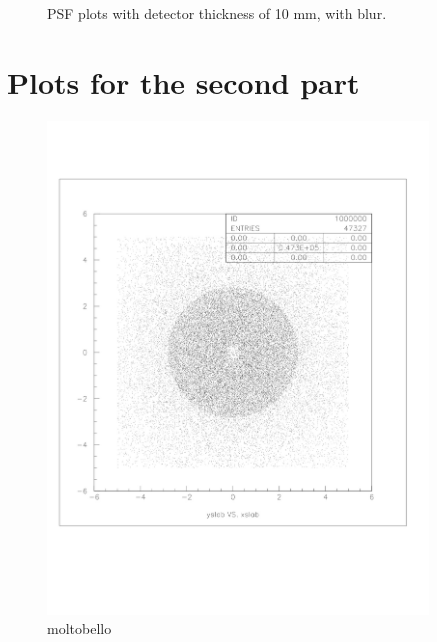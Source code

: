 \documentclass[a4paper]{article}
\begin{document}
\begin{figure}[H]
  \caption{PSF plots with detector thickness of 10 mm, with blur.}
  \label{fig:100_xse}
\end{figure}

\section{Plots for the second part}
\label{sec:appendix_2}

\begin{figure}[H]
  \centering
  \includegraphics[width=0.9\textwidth]{ex_images/2_2d_10.jpg}
  \caption{moltobello}
  \label{fig:2_2d}
\end{figure}
\end{document}
